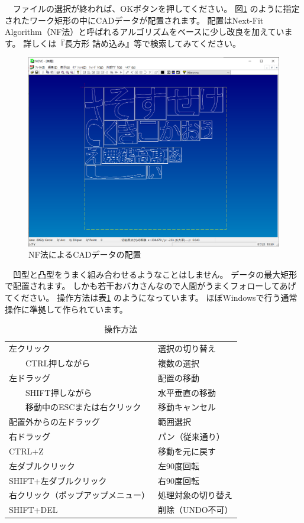 　ファイルの選択が終われば、OKボタンを押してください。
図\ref{fig:sample1.png} のように指定されたワーク矩形の中にCADデータが配置されます。
配置はNext-Fit Algorithm（NF法）と呼ばれるアルゴリズムをベースに少し改良を加えています。
詳しくは『長方形 詰め込み』等で検索してみてください。

\begin{figure}[H]
\centering
\includegraphics[scale=0.5]{No1/fig/sample1.png}
\caption{NF法によるCADデータの配置}
\label{fig:sample1.png}
\end{figure}

　凹型と凸型をうまく組み合わせるようなことはしません。
データの最大矩形で配置されます。
しかも若干おバカさんなので人間がうまくフォローしてあげてください。
操作方法は表\ref{tab:key} のようになっています。
ほぼWindowsで行う通常操作に準拠して作られています。

\begin{table}[H]
\centering
\caption{操作方法}
\label{tab:key}
\begin{tabular}{|l|l|}
\hline
左クリック & 選択の切り替え \\
　　CTRL押しながら & 複数の選択 \\ \hline
左ドラッグ & 配置の移動 \\
　　SHIFT押しながら & 水平垂直の移動 \\
　　移動中のESCまたは右クリック & 移動キャンセル \\ \hline
配置外からの左ドラッグ & 範囲選択 \\ \hline
右ドラッグ & パン（従来通り）\\ \hline
CTRL+Z & 移動を元に戻す \\ \hline
左ダブルクリック & 左90度回転 \\ \hline
SHIFT+左ダブルクリック & 右90度回転 \\ \hline
右クリック（ポップアップメニュー） & 処理対象の切り替え \\ \hline
SHIFT+DEL & 削除（UNDO不可）\\ \hline
\end{tabular}
\end{table}

